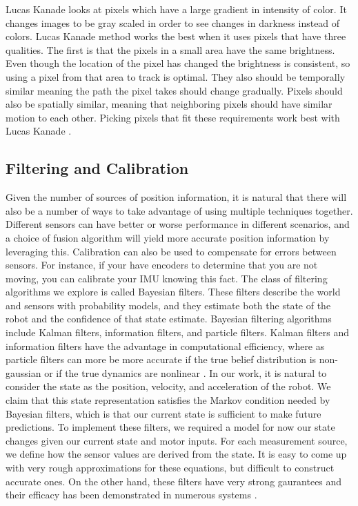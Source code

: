 \documentclass{article}
\begin{document}
    Lucas Kanade looks at pixels which have a large gradient in intensity of color. It changes images to be gray scaled in order to see changes in darkness instead of colors. Lucas Kanade method works the best when it uses pixels that have three qualities. The first is that the pixels in a small area have the same brightness. Even though the location of the pixel has changed the brightness is consistent, so using a pixel from that area to track is optimal. They also should be temporally similar meaning the path the pixel takes should change gradually. Pixels should also be spatially similar, meaning that neighboring pixels should have similar motion to each other. Picking pixels that fit these requirements work best with Lucas Kanade \cite{sun_optical_2008}.

  \subsection{Filtering and Calibration} \label{filtering}

  Given the number of sources of position information, it is natural that there will also be a number of ways to take advantage of using multiple techniques together. Different sensors can have better or worse performance in different scenarios, and a choice of fusion algorithm will yield more accurate position information by leveraging this. Calibration can also be used to compensate for errors between sensors. For instance, if your have encoders to determine that you are not moving, you can calibrate your IMU knowing this fact. The class of filtering algorithms we explore is called Bayesian filters. These filters describe the world and sensors with probability models, and they estimate both the state of the robot and the confidence of that state estimate. Bayesian filtering algorithms include Kalman filters, information filters, and particle filters. Kalman filters and information filters have the advantage in computational efficiency, where as particle filters can more be more accurate if the true belief distribution is non-gaussian or if the true dynamics are nonlinear \cite{thrun_probabilistic_2005}. In our work, it is natural to consider the state as the position, velocity, and acceleration of the robot. We claim that this state representation satisfies the Markov condition needed by Bayesian filters, which is that our current state is sufficient to make future predictions. To implement these filters, we required a model for now our state changes given our current state and motor inputs. For each measurement source, we define how the sensor values are derived from the state. It is easy to come up with very rough approximations for these equations, but difficult to construct accurate ones. On the other hand, these filters have very strong gaurantees and their efficacy has been demonstrated in numerous systems \cite{chui_kalman_1991}\cite{digiampaolo_mobile_2014}\cite{mirzaei_kalman_2008}\cite{nasa_kalman_1999}\cite{saab_standalone_2011}.
\end{document}
